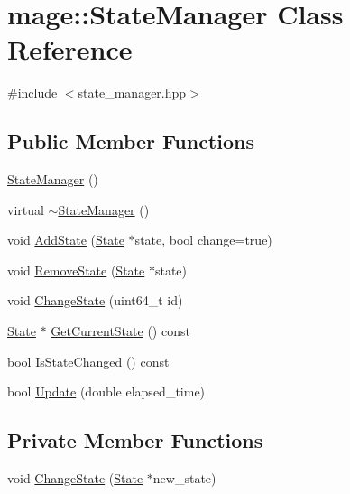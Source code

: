 \hypertarget{classmage_1_1_state_manager}{}\section{mage\+:\+:State\+Manager Class Reference}
\label{classmage_1_1_state_manager}


{\ttfamily \#include $<$state\+\_\+manager.\+hpp$>$}

\subsection*{Public Member Functions}
\begin{DoxyCompactItemize}
\item 
\hyperlink{classmage_1_1_state_manager_a6c4504d0b50fe671299b080f3be30c8e}{State\+Manager} ()
\item 
virtual \hyperlink{classmage_1_1_state_manager_af4bc45cc90437f54e2776e2a8ee747e1}{$\sim$\+State\+Manager} ()
\item 
void \hyperlink{classmage_1_1_state_manager_ae5711ea7782384bc52b09a14cf1f3f5d}{Add\+State} (\hyperlink{classmage_1_1_state}{State} $\ast$state, bool change=true)
\item 
void \hyperlink{classmage_1_1_state_manager_ad1589f7792508f0568f673b925a2bdba}{Remove\+State} (\hyperlink{classmage_1_1_state}{State} $\ast$state)
\item 
void \hyperlink{classmage_1_1_state_manager_a2dfcae20e58167786a2772f204951657}{Change\+State} (uint64\+\_\+t id)
\item 
\hyperlink{classmage_1_1_state}{State} $\ast$ \hyperlink{classmage_1_1_state_manager_ab3a37b1ef0d2e9960ff4c98747c64d3f}{Get\+Current\+State} () const
\item 
bool \hyperlink{classmage_1_1_state_manager_abd9c136e1a0f7e375450be5e50e2fc64}{Is\+State\+Changed} () const
\item 
bool \hyperlink{classmage_1_1_state_manager_a48498596d478d107621b1752104e02e3}{Update} (double elapsed\+\_\+time)
\end{DoxyCompactItemize}
\subsection*{Private Member Functions}
\begin{DoxyCompactItemize}
\item 
void \hyperlink{classmage_1_1_state_manager_acb8123a0682394a7b7af001e6c5e25fe}{Change\+State} (\hyperlink{classmage_1_1_state}{State} $\ast$new\+\_\+state)
\end{DoxyCompactItemize}
